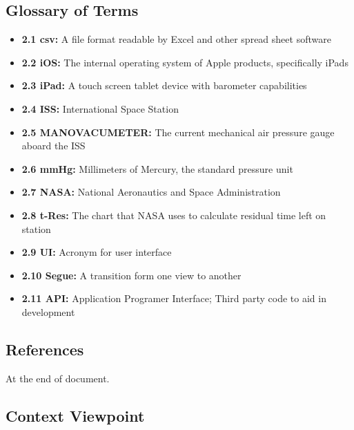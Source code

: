 \documentclass[onecolumn, draftclsnofoot,10pt, compsoc]{IEEEtran}
\begin{document}
\subsection{Glossary of Terms}
\begin{itemize}
\item[] \textbf{2.1 csv:} A file format readable by Excel and other spread sheet software
\item[] \textbf{2.2 iOS:} The internal operating system of Apple products, specifically iPads
\item[] \textbf{2.3 iPad:} A touch screen tablet device with barometer capabilities
\item[] \textbf{2.4 ISS:} International Space Station
\item[] \textbf{2.5 MANOVACUMETER:} The current mechanical air pressure gauge aboard the ISS
\item[] \textbf{2.6 mmHg:} Millimeters of Mercury, the standard pressure unit
\item[] \textbf{2.7 NASA:} National Aeronautics and Space Administration
\item[] \textbf{2.8 t-Res:} The chart that NASA uses to calculate residual time left on station
\item[] \textbf{2.9 UI:} Acronym for user interface
\item[] \textbf{2.10 Segue:} A transition form one view to another
\item[] \textbf{2.11 API:} Application Programer Interface; Third party code to aid in development
\end{itemize}

\subsection{References}
At the end of document.

\subsection{Context Viewpoint}
\end{document}
